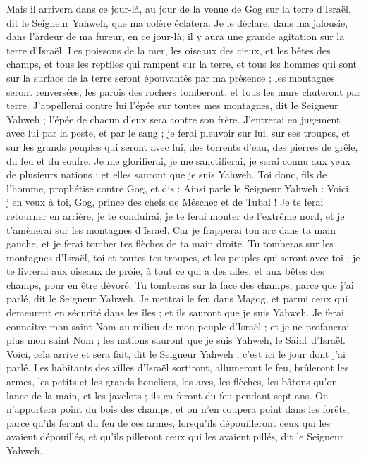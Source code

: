 \begin{multicols}{2}
Mais il arrivera dans ce jour-là, au jour de la venue de Gog sur la terre d'Israël, dit le Seigneur Yahweh, que ma colère éclatera.
Je le déclare, dans ma jalousie, dans l'ardeur de ma fureur, en ce jour-là, il y aura une grande agitation sur la terre d'Israël.
Les poissons de la mer, les oiseaux des cieux, et les bêtes des champs, et tous les reptiles qui rampent sur la terre, et tous les hommes qui sont sur la surface de la terre seront épouvantés par ma présence ; les montagnes seront renversées, les parois des rochers tomberont, et tous les murs chuteront par terre.
J'appellerai contre lui l'épée sur toutes mes montagnes, dit le Seigneur Yahweh ; l'épée de chacun d'eux sera contre son frère.
J'entrerai en jugement avec lui par la peste, et par le sang ; je ferai pleuvoir sur lui, sur ses troupes, et sur les grands peuples qui seront avec lui, des torrents d'eau, des pierres de grêle, du feu et du soufre.
Je me glorifierai, je me sanctifierai, je serai connu aux yeux de plusieurs nations ; et elles sauront que je suis Yahweh.
\VerseOne{}Toi donc, fils de l'homme, prophétise contre Gog, et dis : Ainsi parle le Seigneur Yahweh : Voici, j'en veux à toi, Gog, prince des chefs de Méschec et de Tubal !
Je te ferai retourner en arrière, je te conduirai, je te ferai monter de l'extrême nord, et je t'amènerai sur les montagnes d'Israël.
Car je frapperai ton arc dans ta main gauche, et je ferai tomber tes flèches de ta main droite.
Tu tomberas sur les montagnes d'Israël, toi et toutes tes troupes, et les peuples qui seront avec toi ; je te livrerai aux oiseaux de proie, à tout ce qui a des ailes, et aux bêtes des champs, pour en être dévoré.
Tu tomberas sur la face des champs, parce que j'ai parlé, dit le Seigneur Yahweh.
Je mettrai le feu dans Magog, et parmi ceux qui demeurent en sécurité dans les îles ; et ils sauront que je suis Yahweh.
Je ferai connaître mon saint Nom au milieu de mon peuple d'Israël ; et je ne profanerai plus mon saint Nom ; les nations sauront que je suis Yahweh, le Saint d'Israël.
Voici, cela arrive et sera fait, dit le Seigneur Yahweh ; c'est ici le jour dont j'ai parlé.
Les habitants des villes d'Israël sortiront, allumeront le feu, brûleront les armes, les petits et les grands boucliers, les arcs, les flèches, les bâtons qu'on lance de la main, et les javelots ; ils en feront du feu pendant sept ans.
On n'apportera point du bois des champs, et on n'en coupera point dans les forêts, parce qu'ils feront du feu de ces armes, lorsqu'ils dépouilleront ceux qui les avaient dépouillés, et qu'ils pilleront ceux qui les avaient pillés, dit le Seigneur Yahweh.

\end{multicols}
